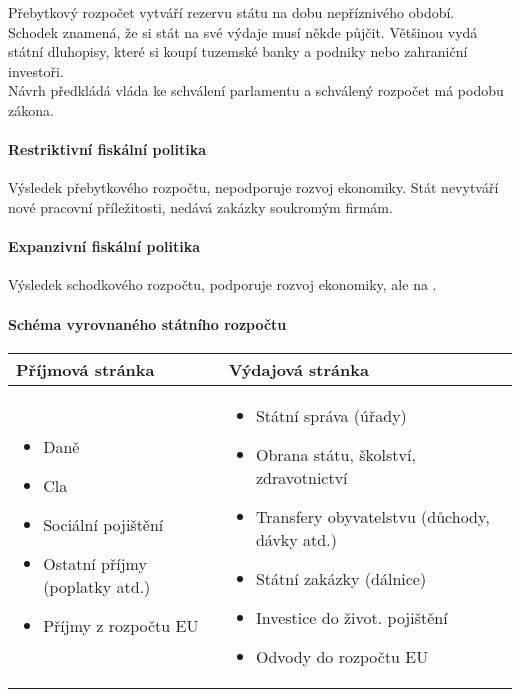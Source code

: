 Přebytkový rozpočet vytváří rezervu státu na dobu nepříznivého období. \\
Schodek znamená, že si stát na své výdaje musí někde půjčit. Většinou vydá státní dluhopisy, které si koupí tuzemské banky a podniky nebo zahraniční investoři. \\
Návrh předkládá vláda ke schválení parlamentu a schválený rozpočet má podobu zákona.

\paragraph{Restriktivní fiskální politika}
Výsledek přebytkového rozpočtu, nepodporuje rozvoj ekonomiky. Stát nevytváří nové pracovní příležitosti, nedává zakázky soukromým firmám.

\paragraph{Expanzivní fiskální politika}
Výsledek schodkového rozpočtu, podporuje rozvoj ekonomiky, ale na .

\paragraph{Schéma vyrovnaného státního rozpočtu}
\begin{table}[h]
    \centering
    \begin{tabular}{| p{8cm} | p{8cm} |} \hline
        Příjmová stránka & Výdajová stránka \\ \hline
        \begin{itemize}
            \item Daně
            \item Cla
            \item Sociální pojištění
            \item Ostatní příjmy (poplatky atd.)
            \item Příjmy z rozpočtu EU
        \end{itemize} &
        \begin{itemize}
            \item Státní správa (úřady)
            \item Obrana státu, školství, zdravotnictví
            \item Transfery obyvatelstvu (důchody, dávky atd.)
            \item Státní zakázky (dálnice)
            \item Investice do život. pojištění
            \item Odvody do rozpočtu EU
        \end{itemize} \\ \hline
    \end{tabular}
\end{table}

